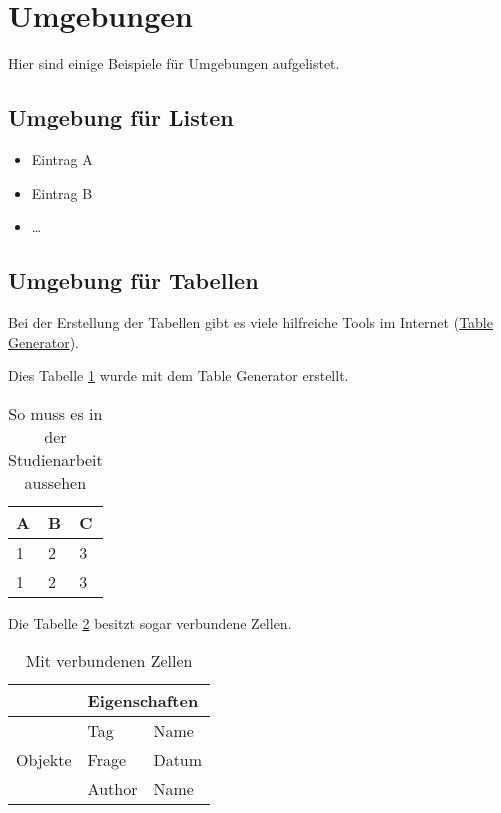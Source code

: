 \section{Umgebungen}\label{sec:umgebungen}
Hier sind einige Beispiele für Umgebungen aufgelistet.

\subsection{Umgebung für Listen}
\begin{itemize}
    \item Eintrag A
    \item Eintrag B
    \item \dots
\end{itemize}

\subsection{Umgebung für Tabellen}
Bei der Erstellung der Tabellen gibt es viele hilfreiche Tools im Internet
(\href{https://www.tablesgenerator.com/}{Table Generator}).

Dies Tabelle \ref{table:simple} wurde mit dem Table Generator erstellt.
\begin{table}[h!]
    \centering
    \caption{So muss es in der Studienarbeit aussehen}
    \label{table:simple}
    \begin{tabular}[t]{|l|l|l|}
        \rowcolor[HTML]{CBCEFB}
        \hline 
        A & B & C \\ \hline
        1 & 2 & 3 \\
        1 & 2 & 3 \\ \hline
    \end{tabular}
\end{table}

Die Tabelle \ref{table:multirow} besitzt sogar verbundene Zellen.
\begin{table}[h!]
    \centering
    \caption{Mit verbundenen Zellen}
    \label{table:multirow}
    \begin{tabular}[t]{|l|l|l|}
    \hline
                             & \multicolumn{2}{l|}{Eigenschaften} \\ \hline
    \multirow{3}{*}{Objekte} & Tag              & Name            \\ \cline{2-3} 
                             & Frage            & Datum           \\ \cline{2-3} 
                             & Author           & Name            \\ \hline
    \end{tabular}
\end{table}
